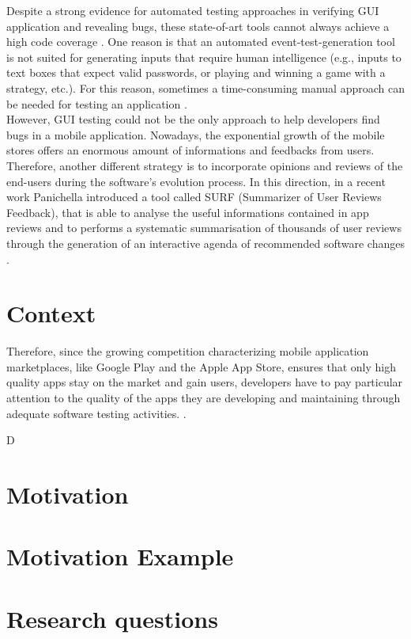 Despite a strong evidence for automated testing approaches in verifying GUI application and revealing bugs, these state-of-art tools cannot always achieve a high code coverage \cite{Nagappan2015}. One reason is that an automated event-test-generation tool is not suited for generating inputs that require human intelligence (e.g., inputs to text boxes that expect valid passwords, or playing and winning a game with a strategy, etc.).
For this reason, sometimes a time-consuming manual approach can be needed for testing an application \cite{Nagappan2015}. \\
However, GUI testing could not be the only approach to help developers find bugs in a mobile application. Nowadays, the exponential growth of the mobile stores offers an enormous amount of informations and feedbacks from users. Therefore, another different strategy is to incorporate opinions and reviews of the end-users during the software's evolution process. \newline
In this direction, in a recent work Panichella \etal introduced a tool called SURF (Summarizer of User Reviews Feedback), that is able to analyse the useful informations contained in app reviews and to performs a systematic summarisation of thousands of user reviews through the generation of an interactive agenda of recommended software changes \cite{DBLP:conf/sigsoft/SorboPASVCG16}.
\section{Context}





Therefore, since the growing competition characterizing mobile application marketplaces, like Google Play and the Apple App Store, ensures that only high quality apps stay on the market and gain users, developers have to pay particular attention to the quality of the apps they are developing and maintaining through adequate software testing activities.
\cite{Martin:tse2017,dynodroid}. 






D

\section{Motivation}
\section{Motivation Example}
\section{Research questions}